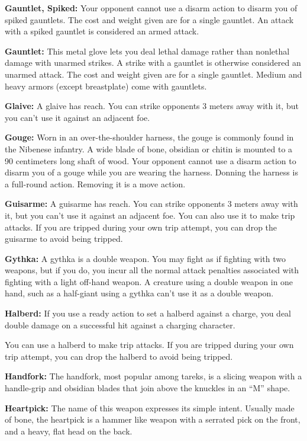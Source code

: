 \textbf{Gauntlet, Spiked:} Your opponent cannot use a disarm action to disarm you of spiked gauntlets. The cost and weight given are for a single gauntlet. An attack with a spiked gauntlet is considered an armed attack. 

\textbf{Gauntlet:} This metal glove lets you deal lethal damage rather than nonlethal damage with unarmed strikes. A strike with a gauntlet is otherwise considered an unarmed attack. The cost and weight given are for a single gauntlet. Medium and heavy armors (except breastplate) come with gauntlets. 

\textbf{Glaive:} A glaive has reach. You can strike opponents 3 meters away with it, but you can't use it against an adjacent foe. 

\textbf{Gouge:} Worn in an over-the-shoulder harness, the gouge is commonly found in the Nibenese infantry. A wide blade of bone, obsidian or chitin is mounted to a 90 centimeters long shaft of wood. Your opponent cannot use a disarm action to disarm you of a gouge while you are wearing the harness. Donning the harness is a full-round action. Removing it is a move action.

\textbf{Guisarme:} A guisarme has reach. You can strike opponents 3 meters away with it, but you can't use it against an adjacent foe.  You can also use it to make trip attacks. If you are tripped during your own trip attempt, you can drop the guisarme to avoid being tripped. 

\textbf{Gythka:} A gythka is a double weapon. You may fight as if fighting with two weapons, but if you do, you incur all the normal attack penalties associated with fighting with a light off-hand weapon. A creature using a double weapon in one hand, such as a half-giant using a gythka can't use it as a double weapon.

\textbf{Halberd:} If you use a ready action to set a halberd against a charge, you deal double damage on a successful hit against a charging character.

You can use a halberd to make trip attacks. If you are tripped during your own trip attempt, you can drop the halberd to avoid being tripped. 

\textbf{Handfork:} The handfork, most popular among tareks, is a slicing weapon with a handle-grip and obsidian blades that join above the knuckles in an ``M'' shape.

\textbf{Heartpick:} The name of this weapon expresses its simple intent. Usually made of bone, the heartpick is a hammer like weapon with a serrated pick on the front, and a heavy, flat head on the back.

